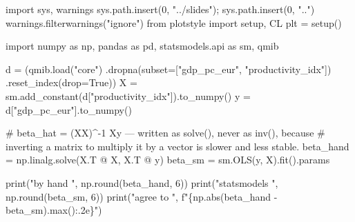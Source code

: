 \documentclass[
  letterpaper,
  10pt,
  twoside,
  openright,
  numbers=noenddot,
  chapterprefix=true]{scrbook}
\newenvironment{Shaded}{}{}
\newcommand{\BuiltInTok}[1]{\textcolor[rgb]{0.84,0.23,0.29}{#1}}
\newcommand{\CommentTok}[1]{\textcolor[rgb]{0.42,0.45,0.49}{#1}}
\newcommand{\DecValTok}[1]{\textcolor[rgb]{0.00,0.36,0.77}{#1}}
\newcommand{\ImportTok}[1]{\textcolor[rgb]{0.01,0.18,0.38}{#1}}
\newcommand{\NormalTok}[1]{\textcolor[rgb]{0.14,0.16,0.18}{#1}}
\newcommand{\OperatorTok}[1]{\textcolor[rgb]{0.14,0.16,0.18}{#1}}
\newcommand{\SpecialCharTok}[1]{\textcolor[rgb]{0.00,0.36,0.77}{#1}}
\newcommand{\SpecialStringTok}[1]{\textcolor[rgb]{0.01,0.18,0.38}{#1}}
\newcommand{\StringTok}[1]{\textcolor[rgb]{0.01,0.18,0.38}{#1}}
\newcommand{\VariableTok}[1]{\textcolor[rgb]{0.89,0.38,0.04}{#1}}
\begin{document}
\label{check-ols}
\begin{Shaded}
\begin{Highlighting}[]
\ImportTok{import}\NormalTok{ sys, warnings}
\NormalTok{sys.path.insert(}\DecValTok{0}\NormalTok{, }\StringTok{"../slides"}\NormalTok{)}\OperatorTok{;}\NormalTok{ sys.path.insert(}\DecValTok{0}\NormalTok{, }\StringTok{".."}\NormalTok{)}
\NormalTok{warnings.filterwarnings(}\StringTok{"ignore"}\NormalTok{)}
\ImportTok{from}\NormalTok{ plotstyle }\ImportTok{import}\NormalTok{ setup, CL}
\NormalTok{plt }\OperatorTok{=}\NormalTok{ setup()}

\ImportTok{import}\NormalTok{ numpy }\ImportTok{as}\NormalTok{ np, pandas }\ImportTok{as}\NormalTok{ pd, statsmodels.api }\ImportTok{as}\NormalTok{ sm, qmib}

\NormalTok{d }\OperatorTok{=}\NormalTok{ (qmib.load(}\StringTok{"core"}\NormalTok{)}
\NormalTok{     .dropna(subset}\OperatorTok{=}\NormalTok{[}\StringTok{"gdp\_pc\_eur"}\NormalTok{, }\StringTok{"productivity\_idx"}\NormalTok{])}
\NormalTok{     .reset\_index(drop}\OperatorTok{=}\VariableTok{True}\NormalTok{))}
\NormalTok{X }\OperatorTok{=}\NormalTok{ sm.add\_constant(d[}\StringTok{"productivity\_idx"}\NormalTok{]).to\_numpy()}
\NormalTok{y }\OperatorTok{=}\NormalTok{ d[}\StringTok{"gdp\_pc\_eur"}\NormalTok{].to\_numpy()}

\CommentTok{\# beta\_hat = (X\textquotesingle{}X)\^{}{-}1 X\textquotesingle{}y — written as solve(), never as inv(), because}
\CommentTok{\# inverting a matrix to multiply it by a vector is slower and less stable.}
\NormalTok{beta\_hand }\OperatorTok{=}\NormalTok{ np.linalg.solve(X.T }\OperatorTok{@}\NormalTok{ X, X.T }\OperatorTok{@}\NormalTok{ y)}
\NormalTok{beta\_sm }\OperatorTok{=}\NormalTok{ sm.OLS(y, X).fit().params}

\BuiltInTok{print}\NormalTok{(}\StringTok{"by hand      "}\NormalTok{, np.}\BuiltInTok{round}\NormalTok{(beta\_hand, }\DecValTok{6}\NormalTok{))}
\BuiltInTok{print}\NormalTok{(}\StringTok{"statsmodels  "}\NormalTok{, np.}\BuiltInTok{round}\NormalTok{(beta\_sm, }\DecValTok{6}\NormalTok{))}
\BuiltInTok{print}\NormalTok{(}\StringTok{"agree to     "}\NormalTok{, }\SpecialStringTok{f"}\SpecialCharTok{\{}\NormalTok{np}\SpecialCharTok{.}\BuiltInTok{abs}\NormalTok{(beta\_hand }\OperatorTok{{-}}\NormalTok{ beta\_sm)}\SpecialCharTok{.}\BuiltInTok{max}\NormalTok{()}\SpecialCharTok{:.2e\}}\SpecialStringTok{"}\NormalTok{)}
\end{Highlighting}
\end{Shaded}
\end{document}
